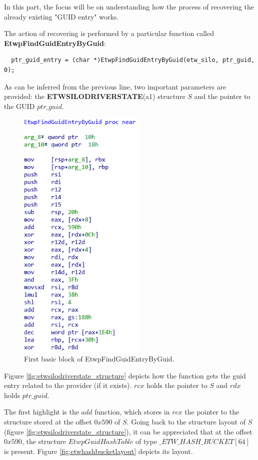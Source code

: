  In this part, the focus will be on understanding how the process of recovering the already existing "GUID entry" works.

  The action of recovering is performed by a particular function called {\bfseries EtwpFindGuidEntryByGuid}:

  \begin{verbatim}
  ptr_guid_entry = (char *)EtwpFindGuidEntryByGuid(etw_silo, ptr_guid, 0);
  \end{verbatim}

  As can be inferred from the previous line, two important parameters are provided: the {\bfseries ETWSILODRIVERSTATE}(a1) structure $S$ and the pointer to the GUID $ptr\_guid$.

  \begin{centering}
  \begin{figure}[H]
    \includegraphics[width=6cm]{images/etwpfindguidguidentrybyguid1.png}
    \caption[]{First basic block of EtwpFindGuidEntryByGuid.}
    \label{fig:EtwpFindGuidEntryByGuid}
  \end{figure}
  \end{centering}

  Figure \ref{fig:etwsilodriverstate_structure} depicts how the function gets the guid entry related to the provider (if it exists). $rcx$ holds the pointer to $S$ and $rdx$ holds $ptr\_guid$.

  The first highlight is the $add$ function, which stores in $rcx$ the pointer to the structure stored at the offset $0x590$ of $S$. Going back to the structure layout of $S$ (figure \ref{fig:etwsilodriverstate_structure}), it can be appreciated that at the offset $0x590$, the structure $EtwpGuidHashTable$ of type $\_ETW\_HASH\_BUCKET[64]$ is present. Figure \ref{fig:etwhashbucketlayout} depicts its layout.

